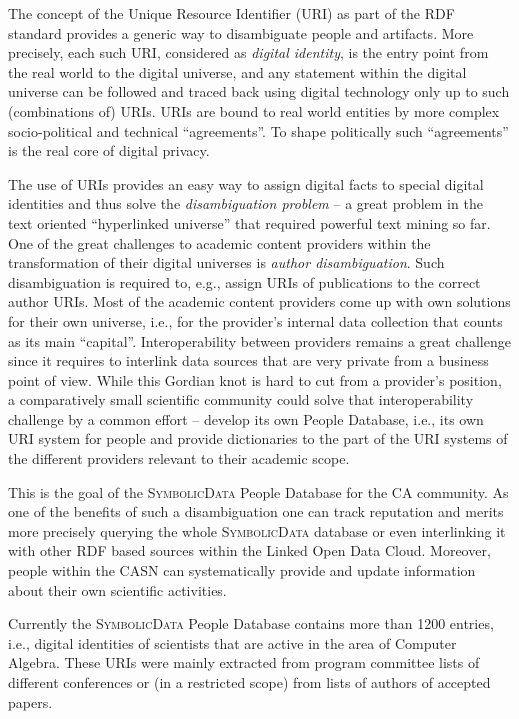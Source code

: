 \documentclass[a4paper,11pt]{article}
\def\SD{\textsc{Symbolic\-Data}}
\begin{document}
\begin{multicols}{2}
\Ueberschriftu{The {\SD} People Database}

The concept of the Unique Resource Identifier (URI) as part of the RDF standard
provides a generic way to disambiguate people and artifacts.  More precisely,
each such URI, considered as \emph{digital identity}, is the entry point from
the real world to the digital universe, and any statement within the digital
universe can be followed and traced back using digital technology only up to
such (combinations of) URIs. URIs are bound to real world entities by more
complex socio-political and technical ``agreements''. To shape politically such
``agreements'' is the real core of digital privacy.

The use of URIs provides an easy way to assign digital facts to special digital
identities and thus solve the \emph{disambiguation problem} -- a great problem
in the text oriented ``hyperlinked universe'' that required powerful text
mining so far.  One of the great challenges to academic content providers
within the transformation of their digital universes is \emph{author
  disambiguation}. Such disambiguation is required to, e.g., assign URIs of
publications to the correct author URIs.  Most of the academic content
providers come up with own solutions for their own universe, i.e., for the
provider's internal data collection that counts as its main ``capital''.
Interoperability between providers remains a great challenge since it requires
to interlink data sources that are very private from a business point of view.
While this Gordian knot is hard to cut from a provider's position, a
comparatively small scientific community could solve that interoperability
challenge by a common effort -- develop its own People Database, i.e., its own
URI system for people and provide dictionaries to the part of the URI systems
of the different providers relevant to their academic scope.

This is the goal of the {\SD} People Database for the CA community.  As one of
the benefits of such a disambiguation one can track reputation and merits more
precisely querying the whole {\SD} database or even interlinking it with other
RDF based sources within the Linked Open Data Cloud. Moreover, people within
the CASN can systematically provide and update information about their own
scientific activities.

Currently the {\SD} People Database contains more than 1200 entries, i.e.,
digital identities of scientists that are active in the area of Computer
Algebra.  These URIs were mainly extracted from program committee lists of
different conferences or (in a restricted scope) from lists of authors of
accepted papers.


\end{multicols}
\end{document}
